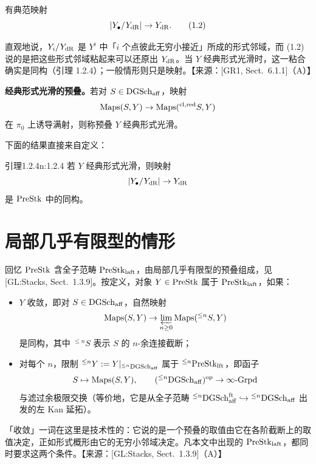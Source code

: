 有典范映射
\begin{equation}
|Y_\bullet/Y_{\mathrm{dR}}|\to Y_{\mathrm{dR}}.\tag{1.2}
\end{equation}

\begin{annote}
直观地说，$Y_i/Y_{\mathrm{dR}}$ 是 $Y^i$ 中「$i$ 个点彼此无穷小接近」所成的形式邻域，而 (1.2) 说的是把这些形式邻域粘起来可以还原出 $Y_{\mathrm{dR}}$。当 $Y$ 经典形式光滑时，这一粘合确实是同构（引理 1.2.4）；一般情形则只是映射。\hfill【来源：[GR1, Sect.~6.1.1]（A）】
\end{annote}

\textbf{经典形式光滑的预叠。}若对 $S\in\mathrm{DGSch}_{\mathrm{aff}}$，映射
\[
\mathrm{Maps}(S,Y)\to\mathrm{Maps}(^{\mathrm{cl,red}} S,Y)
\]
在 $\pi_0$ 上诱导满射，则称预叠 $Y$ 经典形式光滑。

下面的结果直接来自定义：

\begin{othm}{引理}{1.2.4}{n:1.2.4}
若 $Y$ 经典形式光滑，则映射
\[
|Y_\bullet/Y_{\mathrm{dR}}|\to Y_{\mathrm{dR}}
\]
是 $\mathrm{PreStk}$ 中的同构。
\end{othm}

\section{局部几乎有限型的情形}

回忆 $\mathrm{PreStk}$ 含全子范畴 $\mathrm{PreStk}_{\mathrm{laft}}$，由局部几乎有限型的预叠组成，见 [GL:Stacks, Sect.~1.3.9]。按定义，对象 $Y\in\mathrm{PreStk}$ 属于 $\mathrm{PreStk}_{\mathrm{laft}}$，如果：

\begin{itemize}[leftmargin=2.2em]
\item $Y$ 收敛，即对 $S\in\mathrm{DGSch}_{\mathrm{aff}}$，自然映射
\[
\mathrm{Maps}(S,Y)\to\varprojlim_{n\ge 0}\mathrm{Maps}({}^{\le n}S,Y)
\]
是同构，其中 ${}^{\le n}S$ 表示 $S$ 的 $n$-余连接截断；

\item 对每个 $n$，限制 ${}^{\le n}Y:=Y|_{{}^{\le n}\mathrm{DGSch}_{\mathrm{aff}}}$ 属于 ${}^{\le n}\mathrm{PreStk}_{\mathrm{lft}}$，即函子
\[
S\mapsto\mathrm{Maps}(S,Y),\qquad ({}^{\le n}\mathrm{DGSch}_{\mathrm{aff}})^{\mathrm{op}}\to\infty\text{-}\mathrm{Grpd}
\]
与滤过余极限交换（等价地，它是从全子范畴 ${}^{\le n}\mathrm{DGSch}_{\mathrm{aff}}^{\mathrm{ft}}\hookrightarrow{}^{\le n}\mathrm{DGSch}_{\mathrm{aff}}$ 出发的左 Kan 延拓）。
\end{itemize}

\begin{annote}
「收敛」一词在这里是技术性的：它说的是一个预叠的取值由它在各阶截断上的取值决定，正如形式概形由它的无穷小邻域决定。凡本文中出现的 $\mathrm{PreStk}_{\mathrm{laft}}$，都同时要求这两个条件。\hfill【来源：[GL:Stacks, Sect.~1.3.9]（A）】
\end{annote}

